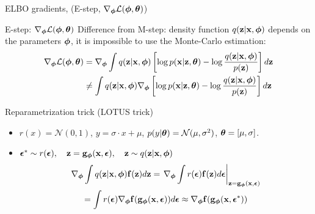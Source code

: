 \begin{frame}{ELBO gradients, (E-step, $\nabla_{\bphi} \mathcal{L}(\bphi, \btheta)$)}
	\begin{block}{E-step: $\nabla_{\bphi} \mathcal{L}(\bphi, \btheta)$}
		Difference from M-step: density function $q(\bz| \bx, \bphi)$ depends on the parameters $\bphi$, it is impossible to use the Monte-Carlo estimation:
		\begin{align*}
			\nabla_{\bphi} \mathcal{L} (\bphi, \btheta) &= \nabla_{\bphi} \int q(\bz | \bx, \bphi) \left[\log p(\bx | \bz, \btheta) - \log \frac{q(\bz| \bx, \bphi)}{p(\bz)} \right] d \bz \\
			& \neq  \int q(\bz | \bx, \bphi) \nabla_{\bphi} \left[\log p(\bx | \bz, \btheta) - \log \frac{q(\bz| \bx, \bphi)}{p(\bz)} \right] d \bz 
		\end{align*}
	\end{block}
	\vspace{-0.5cm}
	\begin{block}{Reparametrization trick (LOTUS trick)} 
		\begin{itemize}
			\item $r(x) = \mathcal{N}(0, 1)$, $y = \sigma \cdot x + \mu$, $p(y|\btheta) = \mathcal{N}(\mu, \sigma^2)$, $\btheta = [\mu, \sigma]$.
			
			\item $\bepsilon^* \sim r(\bepsilon), \quad \bz = \bg_{\bphi}(\bx, \bepsilon), \quad \bz \sim q(\bz | \bx, \bphi)$
			\vspace{-0.3cm}
			\begin{multline*}
				\nabla_{\bphi}\int q(\bz|\bx, \bphi) \bff(\bz) d\bz = \left. \nabla_{\bphi}\int r(\bepsilon)  \bff(\bz) d\bepsilon \right|_{\bz = \bg_{\bphi}(\bx, \bepsilon)} \\ = \int r(\bepsilon) \nabla_{\bphi} \bff(\bg_{\bphi}(\bx, \bepsilon)) d\bepsilon \approx \nabla_{\bphi} \bff(\bg_{\bphi}(\bx, \bepsilon^*))
			\end{multline*}
		\end{itemize}
	\end{block}
\end{frame}

